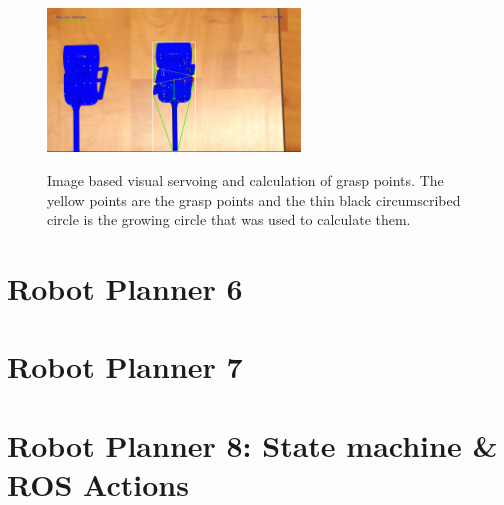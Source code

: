 \begin{center}
\begin{figure}[H]
\centering
\includegraphics[width=0.6\textwidth]{images/grasp-points-triangle.png}\\
\caption{Image based visual servoing and calculation of grasp points. The yellow points are the grasp points and the thin black circumscribed circle is the growing circle that was used to calculate them.}
\end{figure}
\end{center}

\section{Robot Planner 6}

\section{Robot Planner 7}

\section{Robot Planner 8: State machine \& ROS Actions}